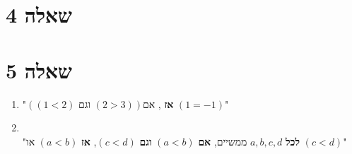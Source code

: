 \documentclass[a4paper,12pt]{report}
\begin{document}
\section*{שאלה 4}


\section*{שאלה 5}
\begin{enumerate}
	\item{
	      \hspace{1em}
	      "$\left( (1<2) \textbf{ וגם } (2>3)\right) \textbf{אם }$, \textbf{אז}
	      $(1=-1)$" \\
	      }
	\item{
	       \\
		  "\textbf{לכל } $a,b,c,d$ ממשיים, \textbf{אם} $(a<b)$ \textbf{וגם} $(c<d)$, {\textbf{אז}} $(a<b)$ או $(c<d)$" \\
	  }
\end{enumerate}

\end{document}
